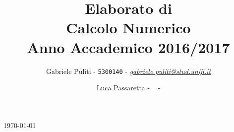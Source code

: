 \documentclass[11pt]{extarticle}
\title{\vspace{2cm}Elaborato di\\ \textbf{Calcolo Numerico}\\ Anno Accademico 2016/2017\vspace{1cm}}
\author{Gabriele Puliti - \texttt{5300140} - \href{mailto:gabriele.puliti@stud.unifi.it}{\textit{gabriele.puliti@stud.unifi.it}}
\and Luca Passaretta - \texttt{ } - \href{mailto: }{\textit{ }}}
\date{}
\begin{document}
\maketitle

\begin{center}
\today{}
\end{center}

\newpage
\
\newpage

\tableofcontents
\newpage
\
\newpage




\newpage

\end{document}
